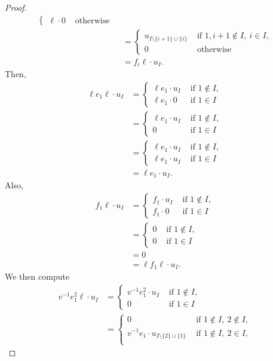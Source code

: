 \documentclass{amsart}
\numberwithin{equation}{section}
\theoremstyle{theorem}
\theoremstyle{definition}
\begin{document}
\begin{proof}
\begin{align*}
\begin{cases}
\ell\cdot 0 & \text{ otherwise } \end{cases} \\
& =\begin{cases} u_{I\setminus \{i+1\}\cup\{i\}} & \text{ if }1,i+1\not\in I,~i\in I,\\ 0 & \text{ otherwise }\end{cases} \\ 
&=f_i\ell\cdot u_I.\end{align*}
Then,
\begin{align*}\ell e_1\ell\cdot u_I&=\begin{cases} \ell e_1\cdot u_{I} & \text{ if }1\not\in I, \\
\ell e_1\cdot 0 & \text{ if }1\in I \end{cases} \\
&=\begin{cases} \ell e_1\cdot u_{I} & \text{ if }1\not\in I,\\
 0 & \text{ if }1\in I \end{cases} \\
 &=\begin{cases} \ell e_1\cdot u_{I} & \text{ if }1\not\in I,\\
 \ell e_1\cdot u_{I} & \text{ if }1\in I \end{cases} \\
&=\ell e_1\cdot u_I.\end{align*}
Also,
\begin{align*}f_1\ell\cdot u_I&=\begin{cases} f_1\cdot u_{I} & \text{ if }1\not\in I, \\
f_1\cdot 0 & \text{ if }1\in I \end{cases} \\
&=\begin{cases} 0 & \text{ if }1\not\in I, \\
 0 & \text{ if }1\in I \end{cases} \\
 &=0 \\
 &=\ell f_1\ell\cdot u_I.\end{align*}
We then compute 
\begin{align*}v^{-1}e_1^2\ell\cdot u_I&=\begin{cases}v^{-1}e_1^2\cdot u_{I} & \text{ if }1\not\in I, \\
 0 & \text{ if }1\in I \end{cases} \\
&=\begin{cases} 0 & \text{ if }1\not\in I,~2\not\in I, \\ v^{-1}e_1\cdot u_{I\setminus\{2\}\cup\{1\}} & \text{ if }1\not\in I,~2\in I,\\

\end{cases}
\end{align*}
\end{proof}
\end{document}
